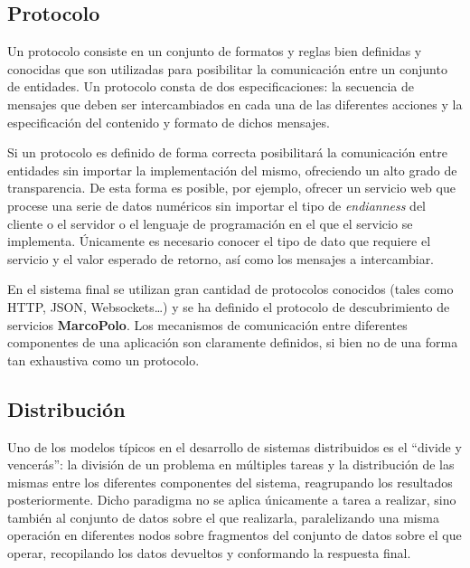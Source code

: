 \subsection{Protocolo}

Un protocolo consiste en un conjunto de formatos y reglas bien definidas y conocidas que son utilizadas para posibilitar la comunicación entre un conjunto de entidades. Un protocolo consta de dos especificaciones: la secuencia de mensajes que deben ser intercambiados en cada una de las diferentes acciones y la especificación del contenido y formato de dichos mensajes.

Si un protocolo es definido de forma correcta posibilitará la comunicación entre entidades sin importar la implementación del mismo, ofreciendo un alto grado de transparencia. De esta forma es posible, por ejemplo, ofrecer un servicio web que procese una serie de datos numéricos sin importar el tipo de \textit{endianness} del cliente o el servidor o el lenguaje de programación en el que el servicio se implementa. Únicamente es necesario conocer el tipo de dato que requiere el servicio y el valor esperado de retorno, así como los mensajes a intercambiar.

En el sistema final se utilizan gran cantidad de protocolos conocidos (tales como HTTP, JSON, Websockets\dots) y se ha definido el protocolo de descubrimiento de servicios \textbf{MarcoPolo}. Los mecanismos de comunicación entre diferentes componentes de una aplicación son claramente definidos, si bien no de una forma tan exhaustiva como un protocolo.

\subsection{Distribución}

Uno de los modelos típicos en el desarrollo de sistemas distribuidos es el ``divide y vencerás'': la división de un problema en múltiples tareas y la distribución de las mismas entre los diferentes componentes del sistema, reagrupando los resultados posteriormente. Dicho paradigma no se aplica únicamente a tarea a realizar, sino también al conjunto de datos sobre el que realizarla, paralelizando una misma operación en diferentes nodos sobre fragmentos del conjunto de datos sobre el que operar, recopilando los datos devueltos y conformando la respuesta final.


